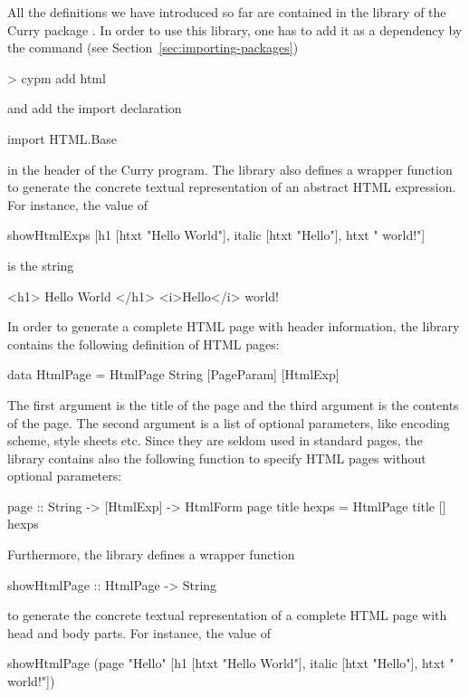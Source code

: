 %
All the definitions we have introduced so far are contained
in the library 
of the Curry package .
In order to use this library, one has to add it as a dependency
by the \cpm command (see Section~\ref{sec:importing-packages})
%
\begin{prog}
> cypm add html
\end{prog}
%
and add the import declaration
\begin{prog}
import HTML.Base
\end{prog}
in the header of the Curry program.
The library  also defines a wrapper function
 to generate the concrete textual
representation of an abstract HTML expression. For instance, the value of
%
\begin{prog}
showHtmlExps [h1 [htxt "Hello World"], italic [htxt "Hello"], htxt " world!"]
\end{prog}
%
is the string
%
\begin{prog}
<h1>
  Hello World
</h1>
<i>Hello</i> world!
\end{prog}
%
In order to generate a complete HTML page with header information,
the  library contains the following definition of HTML pages:
\begin{prog}
data HtmlPage = HtmlPage String [PageParam] [HtmlExp] 
\end{prog}
The first argument is the title of the page
and the third argument is the contents of the page.
The second argument is a list of optional parameters,
like encoding scheme, style sheets etc.
Since they are seldom used in standard pages,
the  library contains also the following function
to specify HTML pages without optional parameters:
\begin{prog}
page :: String -> [HtmlExp] -> HtmlForm
page title hexps = HtmlPage title [] hexps
\end{prog}
%
Furthermore, the  library defines a wrapper function
\begin{prog}
showHtmlPage :: HtmlPage -> String
\end{prog}
to generate the concrete textual
representation of a complete HTML page with head and body parts.
For instance, the value of
%
\begin{prog}
showHtmlPage (page "Hello" [h1 [htxt "Hello World"],
                            italic [htxt "Hello"], htxt " world!"])
\end{prog}
